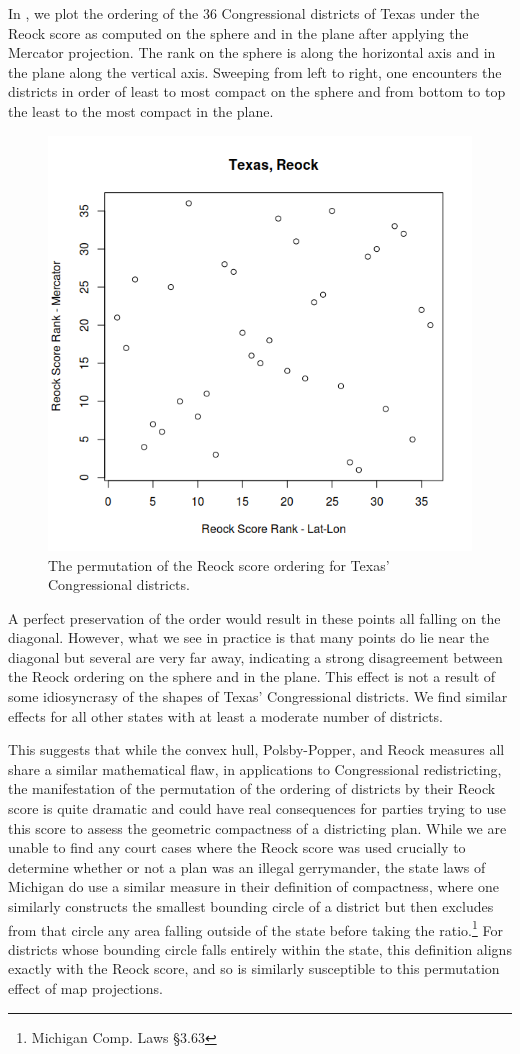 In , we plot the ordering of the 36 Congressional districts of Texas under the Reock score as computed on the sphere and in the plane after applying the Mercator projection.  The rank on the sphere is along the horizontal axis and in the plane along the vertical axis.  Sweeping from left to right, one encounters the districts in order of least to most compact on the sphere and from bottom to top the least to the most compact in the plane.


		\begin{figure}[!h]
	\centering
	\includegraphics[width=.5\textwidth]{figs/texas_reock.png}

	\caption{The permutation of the Reock score ordering for Texas' Congressional districts.}
	\label{fig:reock_exp_tx}
\end{figure}

A perfect preservation of the order would result in these points all falling on the diagonal.  However, what we see in practice is that many points do lie near the diagonal but several are very far away, indicating a strong disagreement between the Reock ordering on the sphere and in the plane.  This effect is not a result of some idiosyncrasy of the shapes of Texas' Congressional districts.  We find similar effects for all other states with at least a moderate number of districts.

This suggests that while the convex hull,  Polsby-Popper, and Reock measures all share a similar mathematical flaw, in applications to Congressional redistricting, the manifestation of the permutation of the ordering of districts by their Reock score is quite dramatic and could have real consequences for parties trying to use this score to assess the geometric compactness of a districting plan.  While we are unable to find any court cases where the Reock score was used crucially to determine whether or not a plan was an illegal gerrymander, the state laws of Michigan do use a similar measure in their definition of compactness, where one similarly constructs the smallest bounding circle of a district but then excludes from that circle any area falling outside of the state before taking the ratio.\footnote{Michigan Comp. Laws \S 3.63}  For districts whose bounding circle falls entirely within the state, this definition aligns exactly with the Reock score, and so is similarly susceptible to this permutation effect of map projections.


